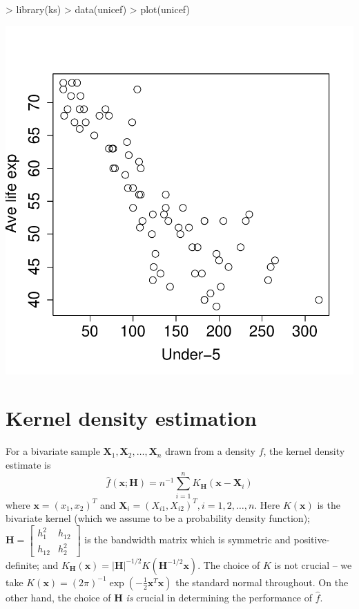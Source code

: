 \documentclass[a4paper,11pt]{article}
\renewcommand{\vec}[1]{\boldsymbol{#1}}
\newcommand{\mat}[1]{\mathbf{#1}}
\def\Hmat{\mat{H}}
\def\vecx{\vec{x}}
\def\vecX{\vec{X}}
\begin{document}
\begin{Schunk}
\begin{Sinput}
> library(ks)
> data(unicef)
> plot(unicef)
\end{Sinput}
\end{Schunk}
\begin{center}
\includegraphics{kde-002}
\end{center}



\section{Kernel density estimation}

For a bivariate sample $\vecX_1, \vecX_2, \ldots, \vecX_n$ drawn from a density $f$, 
the kernel density estimate is 
\begin{equation}
\hat{f} (\vecx; \Hmat) = n^{-1}\sum_{i=1}^n K_{\Hmat} ( \vecx - \vec{X}_i)
\label{eq:kde}
\end{equation}
where $\vecx = (x_1, x_2)^T$ and $\vec{X}_i = (X_{i1}, X_{i2})^T, i = 1, 2,  
\ldots, n$.  
Here 
$K(\vecx)$ is the bivariate kernel (which we assume to be a probability density 
function); $\Hmat = \begin{bmatrix}h_1^2 & h_{12} \\ h_{12}& h_2^2 \end{bmatrix}$ 
is the bandwidth matrix which is symmetric and positive-definite; 
and $K_{\Hmat}(\vecx) = |\Hmat|^{-1/2} 
K( \Hmat^{-1/2} \vecx)$. 
The choice of $K$ is not crucial -- we take 
$K(\vecx) = (2\pi)^{-1} \exp(-\tfrac{1}{2} \vecx^T \vecx)$ the standard normal
throughout.  
On the other hand, the choice of $\Hmat$ \emph{is} crucial in determining 
the performance of $\hat f$. 
\end{document}
